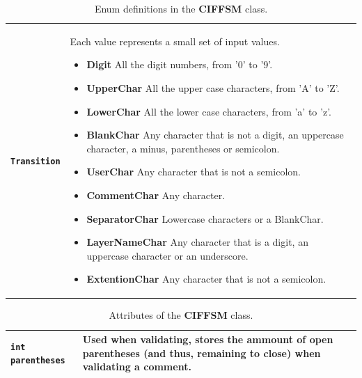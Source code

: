 \documentclass[11pt,twoside,openany,x11names,svgnames]{memoir}
\begin{document}
\begin{table}[h]\footnotesize
\centering
\begin{tabular}{| >{\bfseries}p{2cm} | p{13.5cm} |}
	\hline
	
	\texttt{Transition} & \parbox[t]{13.5cm}{Each value represents a small set of input values.\\
	                                         \begin{itemize}
						                  	 	\item \textbf{Digit} All the digit numbers, from '0' to '9'.
						                     	\item \textbf{UpperChar} All the upper case characters, from 'A' to 'Z'.
						                    	\item \textbf{LowerChar} All the lower case characters, from 'a' to 'z'.
						                    	\item \textbf{BlankChar} Any character that is not a digit, an uppercase character, a minus, parentheses or semicolon.
						                    	\item \textbf{UserChar} Any character that is not a semicolon.
						                    	\item \textbf{CommentChar} Any character.
						                    	\item \textbf{SeparatorChar} Lowercase characters or a BlankChar.
						                    	\item \textbf{LayerNameChar} Any character that is a digit, an uppercase character or an underscore.
						                    	\item \textbf{ExtentionChar} Any character that is not a semicolon.
						                     \end{itemize}
						                    } \\
	
	\hline		
\end{tabular}
\caption{Enum definitions in the \textbf{CIFFSM} class.}
\label{tab:CIFFSM-Types}
\end{table}

\begin{table}[h]\footnotesize
\centering
\begin{tabular}{| >{\bfseries}p{5.5cm} | p{10cm} |}
	\hline
	
	\texttt{int parentheses} & Used when validating, stores the ammount of open parentheses (and thus, remaining to close) when validating a comment. \\
	
	\hline
\end{tabular}
\caption{Attributes of the \textbf{CIFFSM} class.}
\label{tab:CIFFSM-Attributes}
\end{table}
\end{document}
